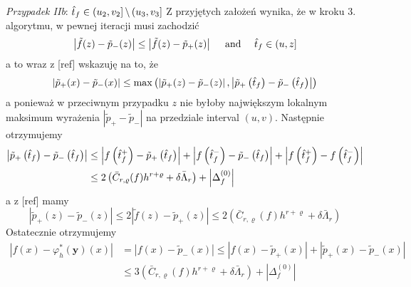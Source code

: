 \documentclass[oik, pdftex, robocza, man]{mgrwms}
\begin{document}
    \textit{Przypadek IIb}: $\hat{t}_{f} \in\left(u_{2}, v_{2}\right] \backslash\left(u_{3}, v_{3}\right]$
    Z przyjętych założeń wynika, że w kroku 3. algorytmu, w pewnej iteracji musi zachodzić
    \begin{equation*}
        \left|\tilde{f}(z)-\tilde{p}_{-}(z)\right| \leq\left|\tilde{f}(z)-\tilde{p}_{+}(z)\right| \quad \text { and } \quad \hat{t}_{f} \in(u, z]        
    \end{equation*}
    a to wraz z [ref] wskazuję na to, że
    \begin{equation*}
        \left|\tilde{p}_{+}(x)-\tilde{p}_{-}(x)\right| \leq \max \left(\left|\tilde{p}_{+}(z)-\tilde{p}_{-}(z)\right|,\left|\tilde{p}_{+}\left(\hat{t}_{f}\right)-\tilde{p}_{-}\left(\hat{t}_{f}\right)\right|\right)        
    \end{equation*}
    a ponieważ  w przeciwnym przypadku $z$ nie byłoby największym lokalnym maksimum wyrażenia $\left|\tilde{p}_{+}-\tilde{p}_{-}\right|$ na przedziale interval $(u, v)$. Następnie otrzymujemy
    \begin{equation*}
        \begin{aligned}
            \left|\tilde{p}_{+}\left(\hat{t}_{f}\right)-\tilde{p}_{-}\left(\hat{t}_{f}\right)\right| & \leq\left|f\left(\hat{t}_{f}^{+}\right)-\tilde{p}_{+}\left(\hat{t}_{f}\right)\right|+\left|f\left(\hat{t}_{f}^{-}\right)-\tilde{p}_{-}\left(\hat{t}_{f}\right)\right|+\left|f\left(\hat{t}_{f}^{+}\right)-f\left(\hat{t}_{f}^{-}\right)\right| \\
            & \leq 2\left(\bar{C}_{r, \varrho}(f) h^{r+\varrho}+\delta \bar{\Lambda}_{r}\right)+\left|\Delta_{f}^{(0)}\right|
        \end{aligned}
    \end{equation*}
    a z [ref] mamy
    \begin{equation*}
        \left|\tilde{p}_{+}(z)-\tilde{p}_{-}(z)\right| \leq 2\left|\tilde{f}(z)-\tilde{p}_{+}(z)\right| \leq 2\left(\bar{C}_{r, \varrho}(f) h^{r+\varrho}+\delta \bar{\Lambda}_{r}\right)
    \end{equation*}
    Ostatecznie otrzymujemy
    \begin{equation*}
        \begin{aligned}
            \left|f(x)-\varphi_{h}^{*}(\mathbf{y})(x)\right| &=\left|f(x)-\tilde{p}_{-}(x)\right| \leq\left|f(x)-\tilde{p}_{+}(x)\right|+\left|\tilde{p}_{+}(x)-\tilde{p}_{-}(x)\right| \\
            & \leq 3\left(\bar{C}_{r, \varrho}(f) h^{r+\varrho}+\delta \bar{\Lambda}_{r}\right)+\left|\Delta_{f}^{(0)}\right|
        \end{aligned}
    \end{equation*}
    
\end{document}
